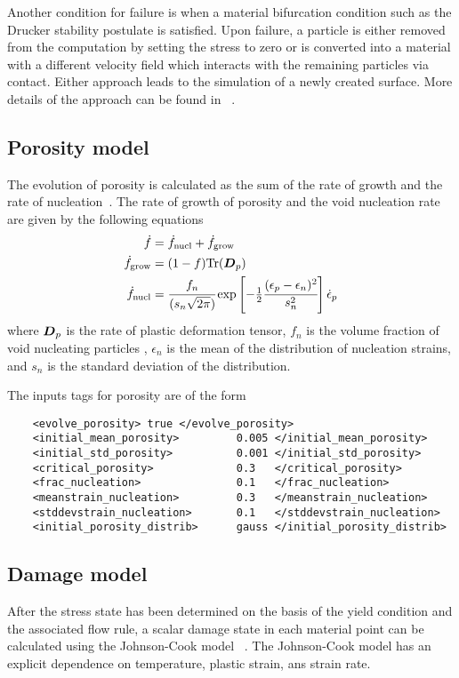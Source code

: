   Another condition for failure is when a material bifurcation 
  condition such as the Drucker stability postulate is satisfied.  Upon failure,
  a particle is either removed from the computation by setting the stress to
  zero or is converted into a material with a different velocity field 
  which interacts with the remaining particles via contact.  Either approach
  leads to the simulation of a newly created surface.  More details of the
  approach can be found in ~\cite{Banerjee2004a,Banerjee2004c,Banerjee2005}.

  \subsection{Porosity model}
  The evolution of porosity is calculated as the sum of the rate of growth 
  and the rate of nucleation~\cite{Ramaswamy1998a}.  The rate of growth of
  porosity and the void nucleation rate are given by the following equations
  ~\cite{Chu1980}
  \begin{align}
    \dot{f} &= \dot{f}_{\text{nucl}} + \dot{f}_{\text{grow}} \\
    \dot{f}_{\text{grow}} & = (1-f) \text{Tr}(\boldsymbol{D}_p) \\
    \dot{f}_{\text{nucl}} & = \cfrac{f_n}{(s_n \sqrt{2\pi})}
            \exp\left[-\tfrac{1}{2} \cfrac{(\epsilon_p - \epsilon_n)^2}{s_n^2}\right]
            \dot{\epsilon}_p
  \end{align}
  where $\boldsymbol{D}_p$ is the rate of plastic deformation tensor, $f_n$ is the volume 
  fraction of void nucleating particles , $\epsilon_n$ is the mean of the 
  distribution of nucleation strains, and $s_n$ is the standard 
  deviation of the distribution.

  The inputs tags for porosity are of the form
  \lstset{language=XML}
  \begin{lstlisting}
    <evolve_porosity> true </evolve_porosity>
    <initial_mean_porosity>         0.005 </initial_mean_porosity>
    <initial_std_porosity>          0.001 </initial_std_porosity>
    <critical_porosity>             0.3   </critical_porosity>
    <frac_nucleation>               0.1   </frac_nucleation>
    <meanstrain_nucleation>         0.3   </meanstrain_nucleation>
    <stddevstrain_nucleation>       0.1   </stddevstrain_nucleation>
    <initial_porosity_distrib>      gauss </initial_porosity_distrib>
  \end{lstlisting}

  \subsection{Damage model}
  After the stress state has been determined on the basis of the yield condition
  and the associated flow rule, a scalar damage state in each material point can
  be calculated using the Johnson-Cook model ~\cite{Johnson1985}.  
  The Johnson-Cook model has an explicit dependence on temperature, plastic
  strain, ans strain rate.

